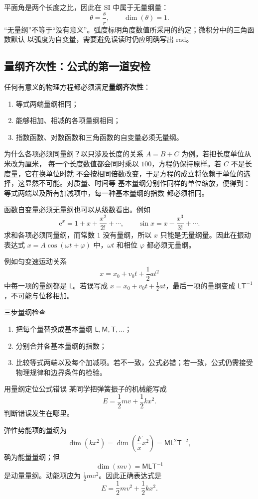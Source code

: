 \documentclass[UTF8,zihao=-4,oneside,openany]{ctexbook}
\numberwithin{equation}{section}
\newcommand{\dimens}[1]{\operatorname{dim}\!\left(#1\right)}
\begin{document}
平面角是两个长度之比，因此在 SI 中属于无量纲量：
\[
  \theta=\frac{s}{r},\qquad \dimens{\theta}=1.
\]
“无量纲”不等于“没有意义”。弧度标明角度数值所采用的约定；微积分中的三角函数默认
以弧度为自变量，需要避免误读时仍应明确写出 \si{\radian}。

\subsection{量纲齐次性：公式的第一道安检}

任何有意义的物理方程都必须满足\textbf{量纲齐次性}：
\begin{enumerate}[label=\arabic*.]
  \item 等式两端量纲相同；
  \item 能够相加、相减的各项量纲相同；
  \item 指数函数、对数函数和三角函数的自变量必须无量纲。
\end{enumerate}

为什么各项必须同量纲？以只涉及长度的关系 $A=B+C$ 为例。若把长度单位从米改为厘米，
每一个长度数值都会同时乘以 $100$，方程仍保持原样。若 $C$ 不是长度量，它在换单位时就
不会按相同倍数改变，于是方程的成立将依赖于单位的选择，这显然不可能。对质量、时间等
基本量纲分别作同样的单位缩放，便得到：等式两端以及所有加减项中，每一种基本量纲的指数
都必须相同。

函数自变量必须无量纲也可以从级数看出。例如
\[
  \mathrm e^x=1+x+\frac{x^2}{2!}+\cdots,
  \qquad
  \sin x=x-\frac{x^3}{3!}+\cdots.
\]
求和各项必须同量纲，而常数 $1$ 没有量纲，所以 $x$ 只能是无量纲量。因此在振动表达式
$x=A\cos(\omega t+\varphi)$ 中，$\omega t$ 和相位 $\varphi$ 都必须无量纲。

例如匀变速运动关系
\[
  x=x_0+v_0t+\frac12 at^2
\]
中每一项的量纲都是 $\mathsf{L}$。若误写成 $x=x_0+v_0t+\frac12 at$，最后一项的量纲变成 $\mathsf{LT}^{-1}$，不可能与位移相加。

\begin{methodbox}{三步量纲检查}
\begin{enumerate}[label=\arabic*.]
  \item 把每个量替换成基本量纲 $\mathsf{L},\mathsf{M},\mathsf{T},\ldots$；
  \item 分别合并各基本量纲的指数；
  \item 比较等式两端以及每个加减项。若不一致，公式必错；若一致，公式仍需接受物理规律和边界条件的检验。
\end{enumerate}
\end{methodbox}

\begin{examplebox}{用量纲定位公式错误}
某同学把弹簧振子的机械能写成
\[
  E=\frac12 mv+\frac12 kx^2.
\]
判断错误发生在哪里。

\tcblower
弹性势能项的量纲为
\[
  \dimens{kx^2}=\dimens{\frac{F}{x}x^2}=\mathsf{ML}^{2}\mathsf{T}^{-2},
\]
确为能量量纲；但
\[
  \dimens{mv}=\mathsf{MLT}^{-1}
\]
是动量量纲。动能项应为 $\frac12 mv^2$。因此正确表达式是
\[
  E=\frac12 mv^2+\frac12 kx^2.
\]
\end{examplebox}
\end{document}
